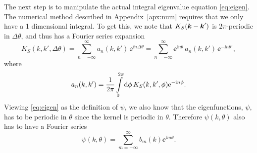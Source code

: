 \documentclass[11pt,a4paper, 
swedish,english %
]{article}
\begin{document}
The next step is to manipulate the actual integral eigenvalue equation
\eqref{eq:eigen}.
The numerical method described in Appendix~\ref{apx:num} requires that
we only have a 1 dimensional integral.
To get this, we note that $K_S(\vb*k-\vb*k')$
is $2\pi$-periodic in $\Delta\theta$, and thus has a Fourier series expansion 
\begin{equation} \label{eq:KS-FS}
K_S(k, k', \Delta\theta)  
=\sum_{n=-\infty}^\infty a_{n}(k, k')\, \ee^{\ii n\Delta\theta}
=\sum_{n=-\infty}^\infty \ee^{\ii n\theta}\,a_{n}(k, k')\,\ee^{-\ii n\theta'},
\end{equation}
where 
\begin{equation}
a_{n}(k, k') = \frac{1}{2\pi} \int_0^{2\pi} \rd\phi\, 
K_S(k, k', \phi)\ee^{-\ii n\phi}.
\end{equation}
Viewing \eqref{eq:eigen} as the definition of $\psi$, we also know
that the eigenfunctions, $\psi$, has to be periodic in 
$\theta$ since the kernel is periodic in $\theta$. Therefore
$\psi(k,\theta)$ also has to have a Fourier series 
\begin{equation}\label{eq:psi-FS}
\psi(k, \theta) = \sum_{m=-\infty}^\infty b_m(k)\ee^{\ii m\theta}.
\end{equation}
\end{document}
